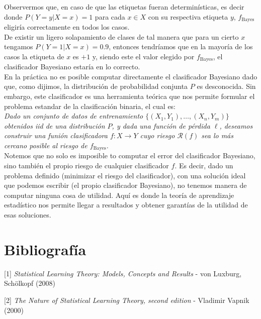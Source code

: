 \documentclass{article}
\begin{document}
Observermos que, en caso de que las etiquetas fueran determinísticas, es decir donde $P(Y=y|X=x)=1$ para cada $x\in X$ con su
respectiva etiqueta $y$, $f_{\text{Bayes}}$ eligiría correctamente en todos los casos.\\
De existir un ligero solapamiento de clases de tal manera que para un cierto $x$ tengamos $P(Y=1|X=x) = 0.9$, entonces tendríamos
que en la mayoría de los casos la etiqueta de $x$ es $+1$ y, siendo este el valor elegido por $f_{\text{Bayes}}$, el clasificador
Bayesiano estaría en lo correcto.\\

En la práctica no es posible computar directamente el clasificador Bayesiano dado que, como dijimos, la distribución de probabilidad
conjunta $P$ es desconocida. Sin embargo, este clasificador es una herramienta teórica que nos permite formular el problema
estandar de la clasificación binaria, el cual es:\\

\textit{Dado un conjunto de datos de entrenamiento $ \{ (X_1,Y_1),\dots,(X_n, Y_m)\}$ obtenidos iid de una distribución $P$, y dada una
función de pérdida $\ell$, deseamos construir una funión clasificadora $f:X\rightarrow Y$ cuyo riesgo $\mathcal{R}(f)$ sea lo
más cercano posible al riesgo de $f_{\text{Bayes}}$.}\\

Notemos que no solo es imposible to computar el error del clasificador Bayesiano, sino también el propio riesgo de cualquier clasificador
$f$. Es decir, dado un problema definido (minimizar el riesgo del clasificador), con una solución ideal que podemos escribir (el propio
clasificador Bayesiano), no tenemos manera de computar ninguna cosa de utilidad. Aquí es donde la teoría de aprendizaje estadístico
nos permite llegar a resultados y obtener garantías de la utilidad de esas soluciones.






\bigbreak
\pagebreak
\section{Bibliografía}

[1] \textit{Statistical Learning Theory: Models, Concepts and Results} - von Luxburg, Schölkopf (2008)

[2] \textit{The Nature of Statistical Learning Theory, second edition} - Vladimir Vapnik (2000)
\end{document}
